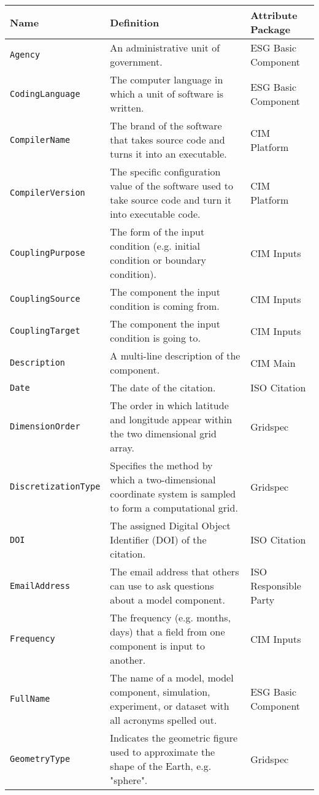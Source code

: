 \begin{tabular}{|p{5cm}|p{7cm}|p{5cm}}
     \hline\hline
     {\bf Name} & {\bf Definition} & {\bf Attribute Package}\\
     \hline\hline
     {\tt Agency} & An administrative unit of government.& ESG Basic Component\\
     {\tt CodingLanguage} & The computer language in which a unit of software is written. & ESG Basic Component\\
     {\tt CompilerName} & The brand of the software that takes source code and turns it into an executable.& CIM Platform\\
     {\tt CompilerVersion} & The specific configuration value of the software used to take source code and turn it into executable code. & CIM Platform\\
     {\tt CouplingPurpose} & The form of the input condition (e.g. initial condition or boundary condition). &  CIM Inputs \\
     {\tt CouplingSource} & The component the input condition is coming from. & CIM Inputs\\ 
     {\tt CouplingTarget} & The component the input condition is going to. & CIM Inputs\\ 
     {\tt Description} & A multi-line description of the component. & CIM Main \\
     {\tt Date} & The date of the citation. & ISO Citation\\
     {\tt DimensionOrder} & The order in which latitude and longitude appear within the two dimensional grid array. & Gridspec\\ 
     {\tt DiscretizationType} & Specifies the method by which a two-dimensional coordinate system is sampled to form a computational grid.& Gridspec \\
     {\tt DOI} & The assigned Digital Object Identifier (DOI) of the citation. & ISO Citation\\
     {\tt EmailAddress} & The email address that others can use to ask questions about a model component. & ISO Responsible Party\\
     {\tt Frequency} & The frequency (e.g. months, days) that a field from one component is input to another. & CIM Inputs\\ 
     {\tt FullName} & The name of a model, model component, simulation, experiment, or dataset with all acronyms spelled out.& ESG Basic Component\\
     {\tt GeometryType} & Indicates the geometric figure used to approximate the shape of the Earth, e.g. "sphere". & Gridspec \\

\end{tabular}

